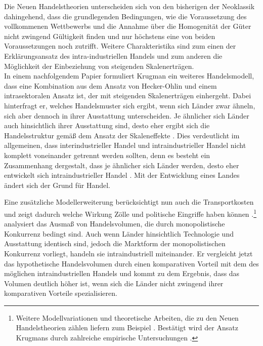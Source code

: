 Die Neuen Handelstheorien unterscheiden sich von den bisherigen der Neoklassik dahingehend, dass die grundlegenden Bedingungen, wie die Voraussetzung des vollkommenen Wettbewerbs und die Annahme {\"u}ber die Homogenit{\"a}t der G{\"u}ter nicht zwingend G{\"u}ltigkeit finden und nur h{\"o}chstens eine von beiden Voraussetzungen noch zutrifft. Weitere Charakteristika sind zum einen der Erkl{\"a}rungsansatz des intra-industriellen Handels und zum anderen die M{\"o}glichkeit der Einbeziehung von steigenden Skalenertr{\"a}gen. \\


In einem nachfolgendem Papier \citep{Krugman.1979b} formuliert Krugman ein weiteres Handelsmodell, dass eine Kombination aus dem Ansatz von Hecker-Ohlin und einem intrasektoralen Ansatz ist, der mit steigenden Skalenertr{\"a}gen einhergeht. Dabei hinterfragt er, welches Handelsmuster sich ergibt, wenn sich L{\"a}nder zwar {\"a}hneln, sich aber dennoch in ihrer Ausstattung unterscheiden. Je {\"a}hnlicher sich L{\"a}nder  auch hinsichtlich ihrer Ausstattung sind, desto eher ergibt sich die Handelsstruktur gem{\"a}{\ss} dem Ansatz der Skaleneffekte \citep{Krugman.79}.\newline
Dies verdeutlicht im allgemeinen, dass interindustrieller Handel und intraindustrieller Handel  nicht komplett voneinander getrennt werden sollten, denn es besteht ein Zusammenhang dergestalt, dass je {\"a}hnlicher sich L{\"a}nder werden, desto eher entwickelt sich intraindustrieller Handel \citep{Krugman.1981}. Mit der Entwicklung eines Landes ändert sich der Grund für Handel.\newline 


Eine zusätzliche Modellerweiterung berücksichtigt nun auch die Transport\-ko\-sten und zeigt dadurch welche Wirkung Z{\"o}lle und politische Eingriffe haben k{\"o}nnen \citep{Krugman.1980}.\footnote{Weitere Modellvariationen und theoretische Arbeiten, die zu den Neuen Handelstheorien z{\"a}hlen liefern zum Beispiel \citet{Grossman.1991b}.
Best{\"a}tigt wird der Ansatz Krugmans durch zahlreiche empirische Untersuchungen \citep{Antweiler.2002}.}\\
\citet{Lancaster.1980} analysiert das Ausma{\ss} von Handelsvolumen, die durch monopolistische Konkurrenz bedingt sind. Auch wenn L{\"a}nder hinsichtlich Technologie und Ausstattung identisch sind, jedoch die Marktform der monopolistischen Konkurrenz vorliegt, handeln sie intraindustriell miteinander. Er vergleicht jetzt das hypothetische Handelsvolumen durch einen komparativen Vorteil mit dem des m{\"o}glichen  intraindustriellen Handels und kommt zu dem Ergebnis, dass das Volumen deutlich h{\"o}her ist, wenn sich die L{\"a}nder nicht zwingend ihrer komparativen Vorteile spezialisieren.\newline



